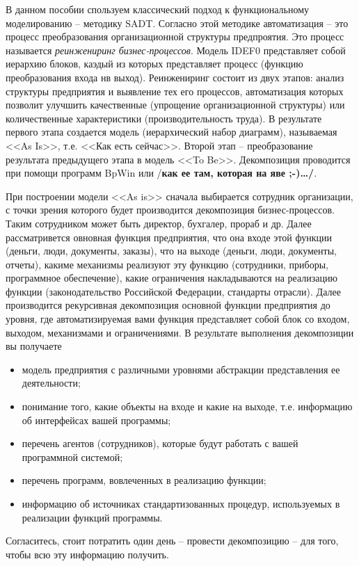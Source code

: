 \documentclass[a4paper,14pt,final]{extreport}
\newcommand{\aaa}[1]{{/\bfseries #1\ldots/}}
\begin{document}
В данном пособии спользуем классический подход к функциональному моделированию -- методику SADT.  Согласно этой методике автоматизация -- это процесс преобразования организационной структуры предпроятия.   Это процесс называется \emph{реинжениринг бизнес-процессов}.  Модель IDEF0 представляет собой иерархию блоков, каэдый из которых представляет процесс (функцию преобразования входа нв выход).  Реинжениринг состоит из двух этапов: анализ структуры предприятия и выявление тех его процессов, автоматизация которых позволит улучшить качественные (упрощение организационной структуры) или количественные характеристики (производительность труда).  В результате первого этапа создается модель (иерархический набор диаграмм), называемая <<As Is>>, т.е. <<Как есть сейчас>>.   Второй этап -- преобразование результата предыдущего этапа в модель <<To Be>>.  Декомпозиция проводится при помощи программ BpWin \cite{bpwin} или \aaa{как ее там, которая на яве ;-)}.

При построении модели <<As is>> сначала выбирается сотрудник организации, с точки зрения которого будет производится декомпозиция бизнес-процессов.  Таким сотрудником может быть директор, бухгалер, прораб и др.  Далее рассматривется овновная функция предприятия, что она входе этой функции (деньги, люди, документы, заказы), что на выходе (деньги, люди, документы, отчеты), какиме механизмы реализуют эту функцию (сотрудники, приборы, программное обеспечение), какие ограничения накладываются на реализацию функции (законодательство Российской Федерации, стандарты отрасли).  Далее производится рекурсивная декомпозиция основной функции предприятия до уровня, где автоматизируемая вами функция представляет собой блок со входом, выходом, механизмами и ограничениями.  В результате выполнения декомпозиции вы получаете
\begin{itemize}
\item модель предприятия с различными уровнями абстракции
  представления ее деятельности;
\item понимание того, какие объекты на входе и какие на выходе, т.е. информацию об интерфейсах вашей программы;
\item перечень агентов (сотрудников), которые будут работать с вашей программной системой;
\item перечень программ, вовлеченных в реализацию функции;
\item информацию об источниках стандартизованных процедур, используемых в реализации функций программы.
\end{itemize}
Согласитесь, стоит потратить один день -- провести декомпозицию -- для того, чтобы всю эту информацию получить.
\end{document}
